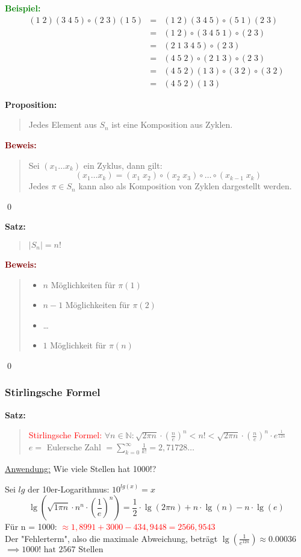 \documentclass{article}
\newcommand{\red}[1]{\textcolor{red}{#1}}
\newcommand{\green}[1]{\textcolor{green}{#1}}
\newcommand{\dgr}[1]{\textcolor{dgr}{#1}}
\newcommand{\maroon}[1]{\textcolor{maroon}{#1}}
\newcommand{\ex}{\green{\textbf{Beispiel: }}}
\newcommand{\prop}[1]{\dgr{\textbf{Proposition: }}\begin{quote}#1\end{quote}}
\newcommand{\se}[1]{\dgr{\textbf{Satz: }}\begin{quote}#1\end{quote}}
\newcommand{\pr}[1]{\maroon{\textbf{Beweis: }}\begin{quote}#1\end{quote}\qed}
\newcommand{\N}{\mathbb{N}}
\begin{document}
\ex 
\begin{equation*}
    \begin{array}{lcl}
        (1 \; 2) (3 \; 4 \; 5) \circ (2 \; 3) (1 \; 5) & = & (1 \; 2) (3 \; 4 \; 5) \circ (5 \; 1) (2 \; 3)\\
        & = & (1 \; 2) \circ (3 \; 4 \; 5 \; 1) \circ (2 \; 3)\\
        & = & (2 \; 1 \; 3 \; 4 \; 5) \circ (2 \; 3)\\
        & = & (4 \; 5 \; 2) \circ (2 \; 1 \; 3) \circ (2 \; 3)\\
        & = & (4 \; 5 \; 2)(1 \; 3) \circ (3 \; 2) \circ (3 \; 2)\\
        & = & (4 \; 5 \; 2)(1 \; 3)
    \end{array}
\end{equation*}

\prop{
    Jedes Element aus $S_n$ ist eine Komposition aus Zyklen.
}

\pr{
    Sei $(x_1 \dots x_k)$ ein Zyklus, dann gilt:
    \begin{equation*}
        (x_1 \dots x_k) = (x_1 \; x_2) \circ (x_2 \; x_3) \circ \dots \circ (x_{k-1} \; x_k)
    \end{equation*}
    Jedes $\pi \in S_n$ kann also als Komposition von Zyklen dargestellt werden.
}

\se{$|S_n| = n!$}

\pr{
    \begin{itemize}
        \item $n$ Möglichkeiten für $\pi(1)$
        \item $n-1$ Möglichkeiten für $\pi(2)$
        \item \dots
        \item $1$ Möglichkeit für $\pi(n)$
    \end{itemize}
}

\subsubsection{Stirlingsche Formel}

\se{
    \red{Stirlingsche Formel:} $\forall n \in \N: \sqrt{2 \pi n} \cdot (\frac{n}{e})^n < n! < \sqrt{2 \pi n} \cdot (\frac{n}{e})^n \cdot e^{\frac{1}{12n}}$\\
    $e = $ Eulersche Zahl $ = \sum_{k = 0}^{\infty}\frac{1}{k!} = 2,71728\dots$
}
\underline{Anwendung:} Wie viele Stellen hat 1000!?

Sei $lg$ der 10er-Logarithmus: $10^{lg(x)} = x$
\begin{equation*}
    \lg(\sqrt{1 \pi n} \cdot n^n \cdot (\frac{1}{e})^n) = \frac{1}{2} \cdot \lg(2 \pi n) + n \cdot \lg(n) - n \cdot \lg(e)
\end{equation*}
Für n = 1000: \red{$\approx 1,8991 + 3000 - 434,9448 = 2566,9543$}\\
Der "Fehlerterm", also die maximale Abweichung, beträgt $\lg(\frac{1}{e^{12n}}) \approx 0.00036$
$\implies 1000! \text{ hat } 2567 \text{ Stellen}$
\end{document}
